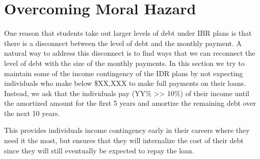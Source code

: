 
\section{Overcoming Moral Hazard}

One reason that students take out larger levels of debt under IBR plans is that there is a
disconnect between the level of debt and the monthly payment. A natural way to address this
disconnect is to find ways that we can reconnect the level of debt with the size of the monthly
payments. In this section we try to maintain some of the income contingency of the IDR plans by not
expecting individuals who make below \$XX,XXX to make full payments on their loans. Instead, we ask
that the individuals pay (YY\% >> 10\%) of their income until the amortized amount for the first 5
years and amortize the remaining debt over the next 10 years.

This provides individuals income contingency early in their careers where they need it the most, but
ensures that they will internalize the cost of their debt since they will still eventually be
expected to repay the loan.
